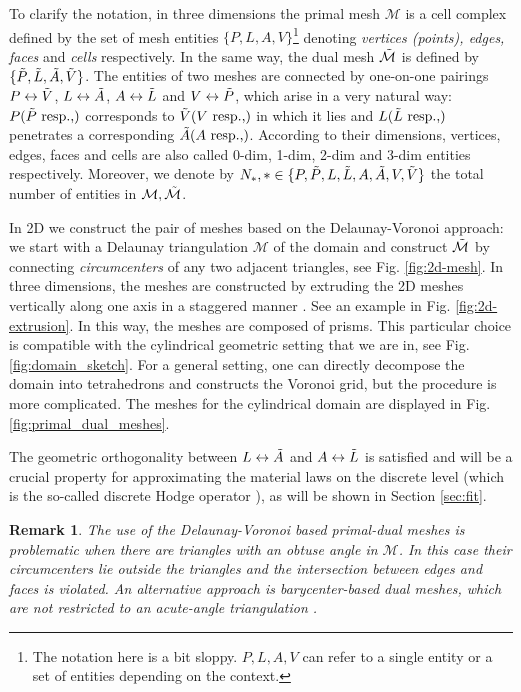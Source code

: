 \documentclass{article}
\newtheorem*{remark}{Remark}
\begin{document}
To clarify the notation, in three dimensions the primal mesh $\mathcal{M}$ is a cell
complex defined by the set of mesh entities $\{P, L, A, V\}$\footnote{The notation here is
  a bit sloppy. $P, L, A, V$ can refer to a single entity or a set of entities depending
  on the context.} denoting \emph{vertices (points), edges, faces} and \emph{cells}
respectively. In the same way, the dual mesh $\Tilde{\mathcal{M}}$ is defined by
$\{\Tilde{P}, \Tilde{L}, \Tilde{A}, \Tilde{V}\}$. The entities of two meshes are
connected by one-on-one pairings $P \leftrightarrow \Tilde{V}$,
$L \leftrightarrow \Tilde{A}$, $A \leftrightarrow \Tilde{L}$ and
$V \leftrightarrow \Tilde{P}$, which arise in a very natural way:
$P(\Tilde{P} \text{ resp.,})$ corresponds to $\Tilde{V}(V \text{ resp.,})$ in which it
lies and $L(\Tilde{L} \text{ resp.,})$ penetrates a corresponding
$\Tilde{A}(A \text{ resp.,})$. According to their dimensions, vertices, edges, faces and
cells are also called 0-dim, 1-dim, 2-dim and 3-dim entities respectively. Moreover, we
denote by $N_\ast, \ast \in \{P, \Tilde{P}, L, \Tilde{L},A, \Tilde{A},V, \Tilde{V}\}$ the
total number of entities in $\mathcal{M}, \Tilde{\mathcal{M}}$.

In 2D we construct the pair of meshes based on the Delaunay-Voronoi approach: we start with a
Delaunay triangulation $\mathcal{M}$ of the domain and construct $\Tilde{\mathcal{M}}$ by
connecting \emph{circumcenters} of any two adjacent triangles, see Fig. \ref{fig:2d-mesh}.
In three dimensions, the meshes are constructed by extruding the 2D meshes vertically
along one axis in a staggered manner \cite[][Sec. 3.1]{Marrone_2001}. See an example in
Fig. \ref{fig:2d-extrusion}. In this way, the meshes are composed of prisms. This
particular choice is compatible with the cylindrical geometric setting that we are in, see
Fig. \ref{fig:domain_sketch}. For a general setting, one can directly decompose the domain
into tetrahedrons and constructs the Voronoi grid, but the procedure is more
complicated. The meshes for the cylindrical domain are displayed in
Fig. \ref{fig:primal_dual_meshes}.

The geometric orthogonality between $L \leftrightarrow \Tilde{A}$ and
$A \leftrightarrow \Tilde{L}$ is satisfied and will be a crucial property for
approximating the material laws on the discrete level (which is the so-called discrete
Hodge operator \cite{hip_1999, bossavit1999}), as will be shown in Section \ref{sec:fit}.

\begin{remark}
  The use of the Delaunay-Voronoi based primal-dual meshes is problematic when there are
  triangles with an obtuse angle in $\mathcal{M}$. In this case their circumcenters lie
  outside the triangles and the intersection between edges and faces is violated. An
  alternative approach is barycenter-based dual meshes, which are not restricted to an
  acute-angle triangulation \cite[][Sec. 4.2]{Marrone_2001}.
\end{remark}
\end{document}

